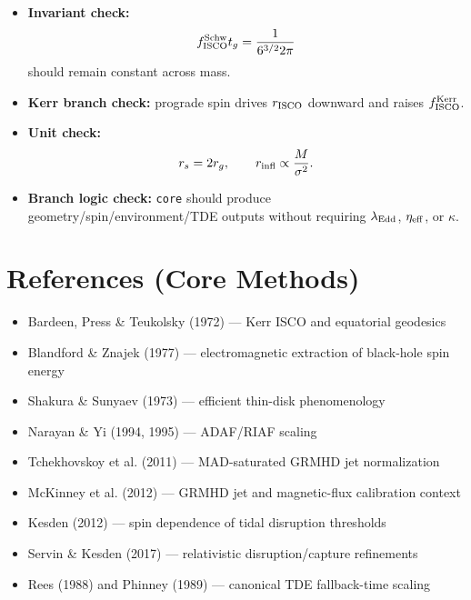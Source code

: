 \documentclass[12pt]{article}
\begin{document}
\begin{itemize}
    \item \textbf{Invariant check:}
    \[
    f_{\rm ISCO}^{\rm Schw} t_g = \frac{1}{6^{3/2}2\pi}
    \]
    should remain constant across mass.
    
    \item \textbf{Kerr branch check:}
    prograde spin drives $r_{\rm ISCO}$ downward and raises $f_{\rm ISCO}^{\rm Kerr}$.
    
    \item \textbf{Unit check:}
    \[
    r_s = 2r_g,
    \qquad
    r_{\rm infl}\propto \frac{M}{\sigma^2}.
    \]
    
    \item \textbf{Branch logic check:}
    \texttt{core} should produce geometry/spin/environment/TDE outputs without requiring
    $\lambda_{\rm Edd}$, $\eta_{\rm eff}$, or $\kappa$.
\end{itemize}

\section*{References (Core Methods)}

\begin{itemize}
    \item Bardeen, Press \& Teukolsky (1972) --- Kerr ISCO and equatorial geodesics
    \item Blandford \& Znajek (1977) --- electromagnetic extraction of black-hole spin energy
    \item Shakura \& Sunyaev (1973) --- efficient thin-disk phenomenology
    \item Narayan \& Yi (1994, 1995) --- ADAF/RIAF scaling
    \item Tchekhovskoy et al. (2011) --- MAD-saturated GRMHD jet normalization
    \item McKinney et al. (2012) --- GRMHD jet and magnetic-flux calibration context
    \item Kesden (2012) --- spin dependence of tidal disruption thresholds
    \item Servin \& Kesden (2017) --- relativistic disruption/capture refinements
    \item Rees (1988) and Phinney (1989) --- canonical TDE fallback-time scaling
\end{itemize}
\end{document}
